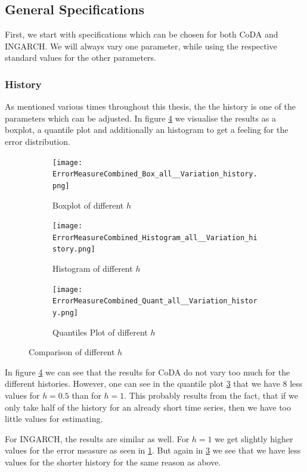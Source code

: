 \subsection{General Specifications}
\label{sec:General Specifications}

First, we start with specifications which can be chosen for both CoDA and INGARCH. We will always vary one parameter, while using the respective standard values for the other parameters. 
\subsubsection{History}
\label{sec:History}

As mentioned various times throughout this thesis, the the history is one of the parameters which can be adjusted. In figure \ref{fig:History Comp1} we visualise the results as a boxplot, a quantile plot  and additionally an histogram to get a feeling for the error distribution. 

\begin{figure}[htb!]
\centering
\begin{subfigure}[b]{0.45\textwidth}
\texttt{[image: ErrorMeasureCombined\_Box\_all\_\_Variation\_history.png]}
\caption{Boxplot of different $h$}
\label{fig:History Box}
\end{subfigure}
\hfill
\begin{subfigure}[b]{0.45\textwidth}
\texttt{[image: ErrorMeasureCombined\_Histogram\_all\_\_Variation\_history.png]}
\caption{Histogram of different $h$}
\label{fig:History Hist}
\end{subfigure}
\hfill
\begin{subfigure}[b]{0.8\textwidth}
\texttt{[image: ErrorMeasureCombined\_Quant\_all\_\_Variation\_history.png]}
\caption{Quantiles Plot of different $h$}
\label{fig:History Quant}
\end{subfigure}
\caption{Comparison of different $h$}
\label{fig:History Comp1}
\end{figure}

In figure \ref{fig:History Comp1} we can see that the results for CoDA do not vary too much for the different histories. However, one can see in the quantile plot \ref{fig:History Quant} that we have 8 less values for  $h=0.5$ than for $h=1$. This probably results from the fact, that if we only take half of the history for an already short time series, then we have too little values for estimating. 

For INGARCH, the results are similar as well. For $h=1$ we get slightly higher values for the error measure as seen in \ref{fig:History Box}. But again in \ref{fig:History Quant} we see that we have less values for the shorter history for the same reason as above. 


